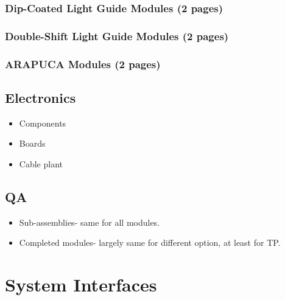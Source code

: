 \subsubsection{Dip-Coated Light Guide Modules (2 pages)}
\label{ssec:fdsp-pd-pc-assy-bar1}

\subsubsection{Double-Shift Light Guide Modules (2 pages)}
\label{ssec:fdsp-pd-pc-assy-bar2}

\subsubsection{ARAPUCA Modules (2 pages)}
\label{ssec:fdsp-pd-pc-assy-arapuca}



\subsection{Electronics}
\label{sec:fdsp-pd-assy-pde}


\begin{itemize}
\item Components
\item Boards
\item Cable plant
\end{itemize}

\subsection{QA}
\label{sec:fdsp-pd-assy-qa}


\begin{itemize}
\item Sub-assemblies- same for all modules.
\item Completed modules- largely same for different option, at least for TP.
\end{itemize}



\section{System Interfaces}
\label{sec:fdsp-pd-intfc}

